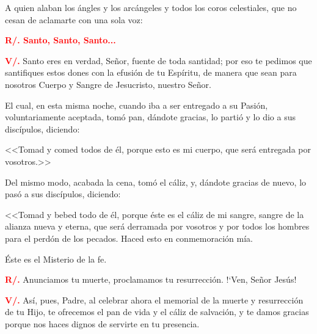 \documentclass[12pt, letterpaper, spanish]{report}
\begin{document}
\hspace{1.5cm} A quien alaban los \'angles y los arc\'angeles
y todos los coros celestiales, que no cesan de aclamarte con una sola voz: \newline

\Large {\bfseries \textcolor{red}{R/. \hspace{0.5cm} Santo, Santo, Santo...}} \newline

\Large \textcolor{red}{\bfseries V/.} \hspace{0.5cm} Santo eres en verdad, Se\~nor, fuente de 
toda santidad; por eso te pedimos que santifiques estos dones con la efusi\'on de tu Esp\'iritu,
de manera que sean para nosotros Cuerpo y \textcolor{red}{} Sangre de Jesucristo,
nuestro Se\~nor. \newline

\hspace{1.5cm} El cual, en esta misma noche, cuando iba a ser entregado a su Pasi\'on,
voluntariamente aceptada, tom\'o pan, d\'andote gracias, lo parti\'o
y lo dio a sus disc\'ipulos, diciendo: \newline

\hspace{1.5cm} <<Tomad y comed todos de \'el, porque esto es mi cuerpo, que ser\'a
entregada por vosotros.>> \newline

\hspace{1.5cm} Del mismo modo, acabada la cena, tom\'o el c\'aliz,
y, d\'andote gracias de nuevo, lo pas\'o a sus disc\'ipulos, diciendo: \newline

\hspace{1.5cm} <<Tomad y bebed todo de \'el, porque \'este es el c\'aliz de mi sangre,
sangre de la alianza nueva y eterna, que ser\'a derramada por vosotros y por todos los
hombres para el perd\'on de los pecados. Haced esto en conmemoraci\'on m\'ia. \newline

\hspace{1.5cm} \'Este es el Misterio de la fe. \newline

\Large \textcolor{red}{\bfseries R/.} \hspace{0.5cm} Anunciamos tu muerte, 
proclamamos tu resurrecci\'on. !`Ven, Se\~nor Jes\'us! \newline

\Large \textcolor{red}{\bfseries V/.} \hspace{0.5cm} Así, pues, Padre,
al celebrar ahora el memorial
de la muerte y resurrecci\'on de tu Hijo,
te ofrecemos el pan de vida y el c\'aliz de salvaci\'on,
y te damos gracias
porque nos haces dignos de servirte en tu presencia.
\end{document}
